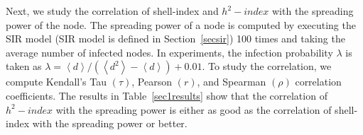 \documentclass[conference]{IEEEtran}
\begin{document}
Next, we study the correlation of shell-index and $h^2-index$ with the spreading power of the node. The spreading power of a node is computed by executing the SIR model (SIR model is defined in Section~\ref{secsir}) 100 times and taking the average number of infected nodes. In experiments, the infection probability $\lambda$ is taken as $\lambda=\left \langle d \right \rangle/(\left \langle d^2 \right \rangle - \left \langle d \right \rangle) + 0.01$. To study the correlation, we compute Kendall's Tau $(\tau)$, Pearson $(r)$, and Spearman $(\rho)$ correlation coefficients. The results in Table~\ref{sec1results} show that the correlation of $h^2-index$ with the spreading power is either as good as the correlation of shell-index with the spreading power or better.

\end{document}
